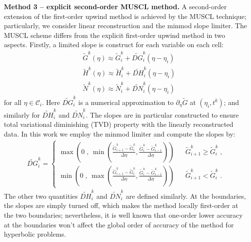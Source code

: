 \documentclass{amsart}
\theoremstyle{definition}
\theoremstyle{remark}
\numberwithin{equation}{section}
\numberwithin{figure}{section}
\begin{document}
\noindent
{\bf Method 3 -- explicit second-order MUSCL method.}
A second-order extension of the first-order upwind method is achieved by the MUSCL technique; particularly, we consider linear reconstruction and the minmod slope limiter.
The MUSCL scheme differs from the explicit first-order upwind method in two aspects.
Firstly, a limited slope is construct for each variable on each cell:
\begin{align*}
&\tilde{G}^k(\eta) \approx \tilde{G}^k_i + \widetilde{DG}^k_i(\eta-\eta_i) \\
&\tilde{H}^k(\eta) \approx \tilde{H}^k_i + \widetilde{DH}^k_i(\eta-\eta_i) \\
&\tilde{N}^k(\eta) \approx \tilde{N}^k_i + \widetilde{DN}^k_i(\eta-\eta_i)
\end{align*}
for all $\eta\in\mathcal{C}_i$.
Here $\widetilde{DG}^k_i$ is a numerical approximation to $\partial_{\eta}\tilde{G}$ at $(\eta_i,t^k)$; and similarly for $\widetilde{DH}^k_i$ and $\widetilde{DN}^k_i$.
The slopes are in particular constructed to ensure total variational diminishing (TVD) property with the linearly reconstructed data.
In this work we employ the minmod limiter and compute the slopes by:
\begin{align*}
\widetilde{DG}^k_i = \left\{\begin{array}{lcl}
\max\left(0\;,\ \min\left(\frac{\tilde{G}^k_{i+1}-\tilde{G}^k_i}{\Delta\eta} , \frac{\tilde{G}^k_i-\tilde{G}^k_{i-1}}{\Delta\eta}\right)\right) & & \tilde{G}^k_{i+1}\ge\tilde{G}^k_i\;, \\
\min\left(0\;,\ \max\left(\frac{\tilde{G}^k_{i+1}-\tilde{G}^k_i}{\Delta\eta} , \frac{\tilde{G}^k_i-\tilde{G}^k_{i-1}}{\Delta\eta}\right)\right) & & \tilde{G}^k_{i+1}<\tilde{G}^k_i\;.
\end{array}\right.
\end{align*}
The other two quantities $\widetilde{DH}^k_i$ and $\widetilde{DN}^k_i$ are defined similarly.
At the boundaries, the slopes are simply turned off, which makes the method locally first-order at the two boundaries; nevertheless, it is well known that one-order lower accuracy at the boundaries won't affect the global order of accuracy of the method for hyperbolic problems.
\end{document}
